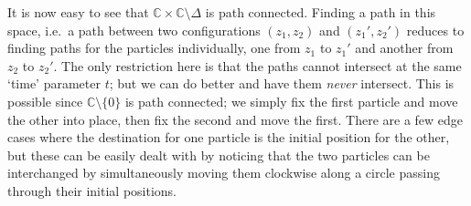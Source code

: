 \documentclass[11pt]{article}
\def\C{\mathbb{C}}
\theoremstyle{definition}
\theoremstyle{remark}
\begin{document}
    It is now easy to see that $\C\times\C\setminus\Delta$ is path connected. Finding
    a path in this space, i.e.\ a path between two configurations $(z_1, z_2)$ and
    $(z_1', z_2')$ reduces to finding paths for the particles individually, one from
    $z_1$ to $z_1'$ and another from $z_2$ to $z_2'$. The only restriction here is
    that the paths cannot intersect at the same `time' parameter $t$; but we can do
    better and have them \emph{never} intersect. This is possible since $\C\setminus
    \{0\}$ is path connected; we simply fix the first particle and move the other
    into place, then fix the second and move the first. There are a few edge cases
    where the destination for one particle is the initial position for the other, but
    these can be easily dealt with by noticing that the two particles can be
    interchanged by simultaneously moving them clockwise along a circle passing
    through their initial positions.
\end{document}
